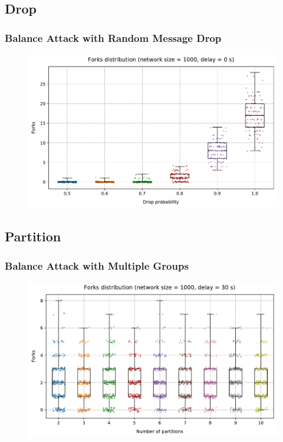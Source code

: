 \documentclass[pdf]{beamer}
\begin{document}
\subsection{Drop}
\begin{frame}
	\frametitle{Balance Attack with Random Message Drop}
	\begin{figure}
		\centering
		\includegraphics[width=\columnwidth]{plots/forks_attack_drop_boxplot_1}
	\end{figure}
\end{frame}

\subsection{Partition}
\begin{frame}
	\frametitle{Balance Attack with Multiple Groups}
	\begin{figure}
		\centering
		\includegraphics[width=\columnwidth]{plots/forks_attack_partitions_boxplot_1}
	\end{figure}
\end{frame}
\end{document}
